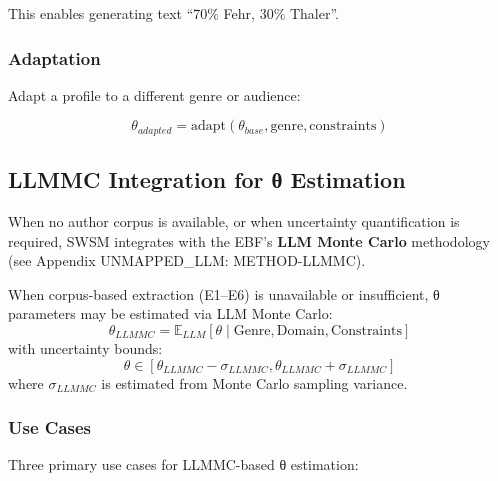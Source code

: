 This enables generating text ``70\% Fehr, 30\% Thaler''.

\subsubsection{Adaptation}

Adapt a profile to a different genre or audience:

\begin{equation}
\theta_{adapted} = \text{adapt}(\theta_{base}, \text{genre}, \text{constraints})
\end{equation}


\subsection{LLMMC Integration for θ Estimation}
\label{sec:sw-llmmc}

When no author corpus is available, or when uncertainty quantification is required,
SWSM integrates with the EBF's \textbf{LLM Monte Carlo} methodology (see Appendix UNMAPPED_LLM: METHOD-LLMMC).

\begin{axiom}
\label{ax:swsm-21}
When corpus-based extraction (E1--E6) is unavailable or insufficient, θ parameters
may be estimated via LLM Monte Carlo:
\begin{equation}
\theta_{LLMMC} = \mathbb{E}_{LLM}[\theta \mid \text{Genre}, \text{Domain}, \text{Constraints}]
\end{equation}
with uncertainty bounds:
\begin{equation}
\theta \in [\theta_{LLMMC} - \sigma_{LLMMC}, \theta_{LLMMC} + \sigma_{LLMMC}]
\end{equation}
where $\sigma_{LLMMC}$ is estimated from Monte Carlo sampling variance.
\end{axiom}

\subsubsection{Use Cases}

Three primary use cases for LLMMC-based θ estimation:

